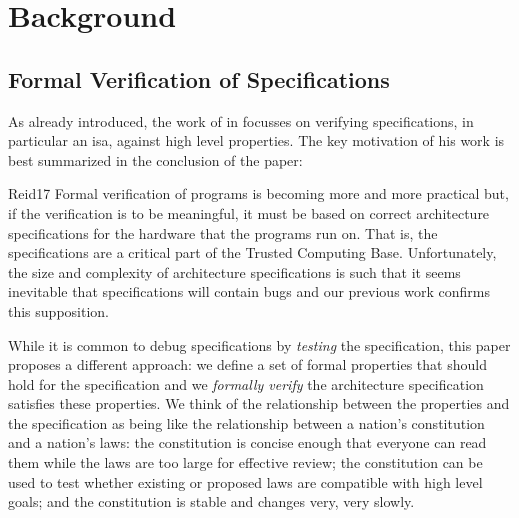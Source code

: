 
\section{Background}


\subsection{Formal Verification of Specifications}
\label{sec:verify-spec}

As already introduced, the work of \citeauthor{Reid17} in  \cite{Reid17} focusses on verifying specifications, in particular an \gls{isa}, against high level properties.
The key motivation of his work is best summarized in the conclusion of the paper:
\begin{displaycquote}[p.88:22]{Reid17}
    Formal verification of programs is becoming more and more practical but, if the verification is to be meaningful, it must be based on correct architecture specifications for the hardware that the programs run on.
    That is, the specifications are a critical part of the Trusted Computing Base.
    Unfortunately, the size and complexity of architecture specifications is such that it seems inevitable that specifications will contain bugs and our previous work confirms this supposition.

    While it is common to debug specifications by \textit{testing} the specification, this paper proposes a different approach:
    we define a set of formal properties that should hold for the specification and we \textit{formally verify} the architecture specification satisfies these properties.
    We think of the relationship between the properties and the specification as being like the relationship between a nation's constitution and a nation's laws:
    the constitution is concise enough that everyone can read them while the laws are too large for effective review; the constitution can be used to test whether existing or proposed laws are compatible with high level goals; and the constitution is stable and changes very, very slowly.
\end{displaycquote}

